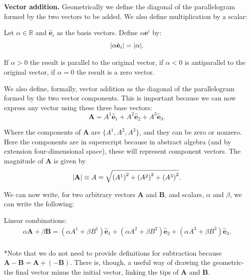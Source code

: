 \documentclass[../main.tex]{subfiles}
\begin{document}
	\vspace{1\baselineskip}
	\textbf{Vector addition.} Geometrically we define the diagonal of the parallelogram formed by the two vectors to be added. We also define multiplication by a scalar:
	\begin{definition}
	  Let $\alpha \in \mathbb{R}$ and $\hat{\mathbf{e}}_{i}$ as the basis vectors. Define $\alpha \mathbf{e}^{i}$ by:
	  \begin{equation}
		\vqty{\alpha \hat{\mathbf{e}}_{i}} = \vqty{\alpha}.
	  \end{equation}

	  If $\alpha>0$ the result is parallel to the original vector, if $\alpha<0$ is antiparallel to the original vector, if $\alpha=0$ the result is a zero vector.
	\end{definition}
	
	We also define, formally, vector addition as the diagonal of the parallelogram formed by the two vector components. This is important because we can now express any vector using these three base vectors:
	\begin{equation}
	  \mathbf{A} = A^{1}\hat{\mathbf{e}}_1 + A^{2}\hat{\mathbf{e}}_2 + A^{3}\hat{\mathbf{e}}_3.
	\end{equation}

	Where the components of $\mathbf{A}$ are $\{A^{1},A^{2},A^{3}\}$, and they can be zero or nonzero. Here the components are in superscript because in abstract algebra (and by extension four-dimensional space), these will represent component vectors. The magnitude of $\mathbf{A}$ is given by
	\begin{equation}
	  \vqty{\mathbf{A}} \equiv A = \sqrt{\left( A^{1} \right)^{2} + \left( A^{2} \right)^{2} + \left( A^{3} \right)^{2}}.
	\end{equation}

	We can now write, for two arbitrary vectors $\mathbf{A}$ and $\mathbf{B}$, and scalars, $\alpha$ and $\beta$, we can write the following:
	\begin{definition}
		Linear combinations:
		\begin{equation}
		  \begin{aligned}
		  \alpha \mathbf{A} + \beta \mathbf{B} = (\alpha A^{1} + \beta B^{1})\hat{\mathbf{e}}_1 + (\alpha A^{2} + \beta B^{2})\hat{\mathbf{e}}_2 + (\alpha A^{3} + \beta B^{3})\hat{\mathbf{e}}_3. \\
		  \end{aligned}
		\end{equation}

		*Note that we do not need to provide definitions for subtraction because $\mathbf{A}-\mathbf{B} = \mathbf{A} + (-\mathbf{B})$. There is, though, a useful way of drawing the geometric- the final vector minus the initial vector, linking the tips of $\mathbf{A}$ and $\mathbf{B}$.
	\end{definition}
\end{document}
